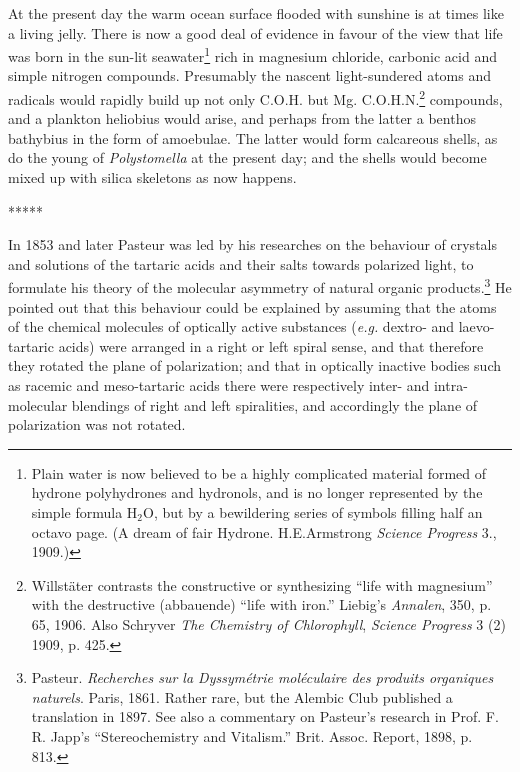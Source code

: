 \documentclass[a4paper, 12pt, oneside, landscape]{article}
\begin{document}
At the present day the warm ocean surface flooded with sunshine is at times like a living jelly. There is now a good deal of evidence in favour of the view that life was born in the sun-lit seawater\footnote{Plain water is now believed to be a highly complicated material formed of hydrone polyhydrones and hydronols, and is no longer represented by the simple formula H$_{2}$O, but by a bewildering series of symbols filling half an octavo page. (A dream of fair Hydrone. H.E.Armstrong \emph{Science Progress} 3., 1909.)} rich in magnesium chloride, carbonic acid and simple nitrogen compounds. Presumably the nascent light-sundered atoms and radicals would rapidly build up not only C.O.H. but Mg. C.O.H.N.\footnote{Willstäter contrasts the constructive or synthesizing ``life with magnesium'' with the destructive (abbauende) ``life with iron.'' Liebig's \emph{Annalen}, 350, p. 65, 1906. Also Schryver \emph{The Chemistry of Chlorophyll}, \emph{Science Progress} 3 (2) 1909, p. 425.} compounds, and a plankton heliobius would arise, and perhaps from the latter a benthos bathybius in the form of amoebulae. The latter would form calcareous shells, as do the young of \emph{Polystomella} at the present day; and the shells would become mixed up with silica skeletons as now happens.

\centerline{*\hspace{15mm}*\hspace{15mm}*\hspace{15mm}*\hspace{15mm}*}
\bigskip

In 1853 and later Pasteur was led by his researches on the behaviour of crystals and solutions of the tartaric acids and their salts towards polarized light, to formulate his theory of the molecular asymmetry of natural organic products.\footnote{Pasteur. \emph{Recherches sur la Dyssymétrie moléculaire des produits organiques naturels}. Paris, 1861. Rather rare, but the Alembic Club published a translation in 1897. See also a commentary on Pasteur's research in Prof. F. R. Japp's ``Stereochemistry and Vitalism.'' Brit. Assoc. Report, 1898, p. 813.} He pointed out that this behaviour could be explained by assuming that the atoms of the chemical molecules of optically active substances (\emph{e.g.} dextro- and laevo-tartaric acids) were arranged in a right or left spiral sense, and that therefore they rotated the plane of polarization; and that in optically inactive bodies such as racemic and meso-tartaric acids there were respectively inter- and intra-molecular blendings of right and left spiralities, and accordingly the plane of polarization was not rotated.
\end{document}
